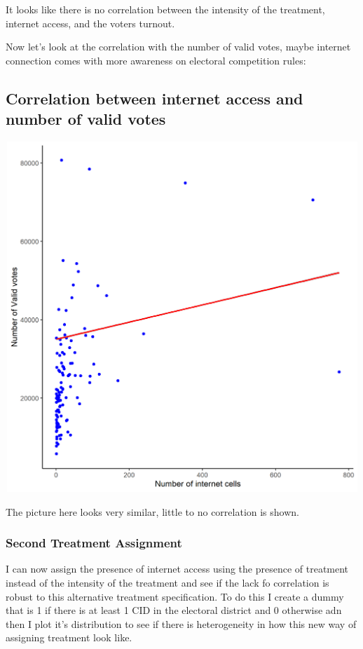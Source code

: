 \documentclass[
]{article}
\begin{document}
It looks like there is no correlation between the intensity of the
treatment, internet access, and the voters turnout.

Now let's look at the correlation with the number of valid votes, maybe
internet connection comes with more awareness on electoral competition
rules:

\hypertarget{correlation-between-internet-access-and-number-of-valid-votes}{%
\subsection{Correlation between internet access and number of valid
votes}\label{correlation-between-internet-access-and-number-of-valid-votes}}

\includegraphics[width=6.25in,height=5.20833in]{comp.png}

The picture here looks very similar, little to no correlation is shown.

\hypertarget{second-treatment-assignment}{%
\subsubsection{Second Treatment
Assignment}\label{second-treatment-assignment}}

I can now assign the presence of internet access using the presence of
treatment instead of the intensity of the treatment and see if the lack
fo correlation is robust to this alternative treatment specification. To
do this I create a dummy that is 1 if there is at least 1 CID in the
electoral district and 0 otherwise adn then I plot it's distribution to
see if there is heterogeneity in how this new way of assigning treatment
look like.
\end{document}
